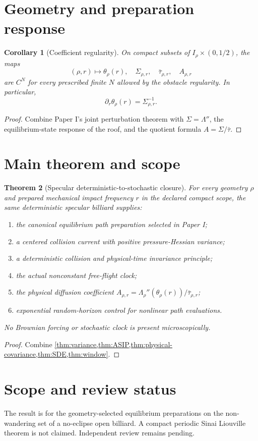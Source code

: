 \documentclass[11pt,reqno]{amsart}
\newtheorem{theorem}{Theorem}[section]
\newtheorem{corollary}[theorem]{Corollary}
\theoremstyle{definition}
\theoremstyle{remark}
\begin{document}
\section{Geometry and preparation response}\label{sec:response}
\begin{corollary}[Coefficient regularity]\label{cor:regularity}
On compact subsets of $I_\rho\times(0,1/2)$, the maps
\[
 (\rho,r)\mapsto
 \theta_\rho(r),\quad
 \Sigma_{\rho,r},\quad
 \bar\tau_{\rho,r},\quad
 A_{\rho,r}
\]
are $C^N$ for every prescribed finite $N$ allowed by the obstacle regularity.
In particular,
\[
 \partial_r\theta_\rho(r)=\Sigma_{\rho,r}^{-1}.
\]
\end{corollary}
\begin{proof}
Combine Paper I's joint perturbation theorem with
$\Sigma=\Lambda''$, the equilibrium-state response of the roof, and the
quotient formula $A=\Sigma/\bar\tau$.
\end{proof}

\section{Main theorem and scope}\label{sec:main}
\begin{theorem}[Specular deterministic-to-stochastic closure]\label{thm:main}
For every geometry $\rho$ and prepared mechanical impact frequency $r$ in the
declared compact scope, the same deterministic specular billiard supplies:
\begin{enumerate}[label=(\roman*)]
\item the canonical equilibrium path preparation selected in Paper I;
\item a centered collision current with positive pressure-Hessian variance;
\item a deterministic collision and physical-time invariance principle;
\item the actual nonconstant free-flight clock;
\item the physical diffusion coefficient
$A_{\rho,r}=\Lambda_\rho''(\theta_\rho(r))/\bar\tau_{\rho,r}$;
\item exponential random-horizon control for nonlinear path evaluations.
\end{enumerate}
No Brownian forcing or stochastic clock is present microscopically.
\end{theorem}
\begin{proof}
Combine \cref{thm:variance,thm:ASIP,thm:physical-covariance,thm:SDE,thm:window}.
\end{proof}

\section*{Scope and review status}
The result is for the geometry-selected equilibrium preparations on the
non-wandering set of a no-eclipse open billiard.  A compact periodic Sinai
Liouville theorem is not claimed.  Independent review remains pending.

\nocite{*}


\end{document}
